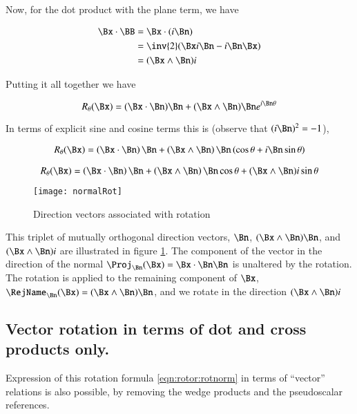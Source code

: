 Now, for the dot product with the plane term, we have

\begin{align*}
\Bx \cdot \BB
&= \Bx \cdot (i \Bn) \\
&= \inv{2}(\Bx i \Bn - i \Bn \Bx) \\
&= (\Bx \wedge \Bn)i \\
\end{align*}

Putting it all together we have

\begin{equation}\label{eqn:rotor:rotexp}
R_\theta(\Bx) 
= (\Bx \cdot \Bn) \Bn + (\Bx \wedge \Bn)\Bn e^{{i\Bn}\theta}
\end{equation}

In terms of explicit sine and cosine terms this is (observe that $(i\Bn)^2 = -1$),

\begin{align*}
R_\theta(\Bx) 
&= \left(\Bx \cdot \Bn\right) \Bn + \left(\Bx \wedge \Bn\right)\Bn \left(\cos\theta + i\Bn \sin\theta\right) \\
\end{align*}

\begin{equation}\label{eqn:rotor:rotnorm}
R_\theta(\Bx) =
\left(\Bx \cdot \Bn\right) \Bn + \left(\Bx \wedge \Bn\right)\Bn \cos\theta + (\Bx \wedge \Bn) i \sin\theta 
\end{equation}

\begin{figure}[htp]
\centering
\texttt{[image: normalRot]}
\caption{Direction vectors associated with rotation}\label{fig:normalRot}
\end{figure}

This triplet of mutually orthogonal direction vectors, 
$\Bn$, $(\Bx \wedge \Bn)\Bn$, and $(\Bx \wedge \Bn) i$
are illustrated in figure \ref{fig:normalRot}.  The component of the vector in the direction of the normal
$\Proj_\Bn(\Bx) = \Bx \cdot \Bn \Bn$ is unaltered by the rotation.
The rotation is applied to the remaining component of $\Bx$, $\RejName_{\Bn}(\Bx) = (\Bx \wedge \Bn)\Bn$, and we rotate
in the direction $(\Bx \wedge \Bn) i$

\subsection{Vector rotation in terms of dot and cross products only. }

Expression of this rotation formula \ref{eqn:rotor:rotnorm} in terms of ``vector'' relations is also possible, by removing the wedge
products and the pseudoscalar references.

